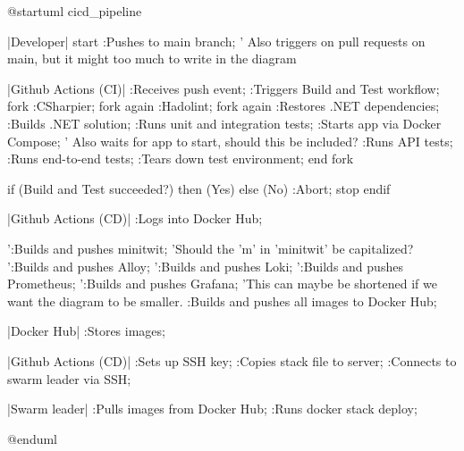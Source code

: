 \begin{plantuml}
@startuml cicd_pipeline

|Developer|
start
:Pushes to main branch;
' Also triggers on pull requests on main, but it might too much to write in the diagram

|Github Actions (CI)|
:Receives push event;
:Triggers Build and Test workflow;
fork
    :CSharpier;
fork again
    :Hadolint;
fork again
    :Restores .NET dependencies;
    :Builds .NET solution;
    :Runs unit and integration tests;
    :Starts app via Docker Compose;
    ' Also waits for app to start, should this be included?
    :Runs API tests;
    :Runs end-to-end tests;
    :Tears down test environment;
end fork

if (Build and Test succeeded?) then (Yes)
else (No)
    :Abort;
    stop
endif

|Github Actions (CD)|
:Logs into Docker Hub;

':Builds and pushes minitwit;
'Should the 'm' in 'minitwit' be capitalized?
':Builds and pushes Alloy;
':Builds and pushes Loki;
':Builds and pushes Prometheus;
':Builds and pushes Grafana;
'This can maybe be shortened if we want the diagram to be smaller.
:Builds and pushes all images to Docker Hub;


|Docker Hub|
:Stores images;

|Github Actions (CD)|
:Sets up SSH key;
:Copies stack file to server;
:Connects to swarm leader via SSH;


|Swarm leader|
:Pulls images from Docker Hub;
:Runs docker stack deploy;


@enduml
\end{plantuml}